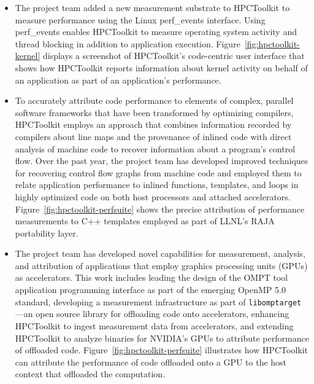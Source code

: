 \begin{itemize}
\item
The project team added a new measurement substrate to HPCToolkit to measure performance using the Linux perf\_events interface. Using perf\_events enables HPCToolkit to measure operating system activity and thread blocking in addition to application execution. Figure~\ref{fig:hpctoolkit-kernel} displays a screenshot of HPCToolkit's code-centric user interface that shows how HPCToolkit reports information about kernel activity on behalf of an application as part of an application's performance. 
 \item
To accurately attribute code performance to elements of complex, parallel software frameworks that have been transformed  by optimizing compilers, HPCToolkit employs an approach that combines information recorded by compilers about line maps and the provenance of inlined code with direct analysis of machine code to recover information about a program's control flow. Over the past year, the project team has developed improved techniques for recovering control flow graphs from machine code 
 and employed them to relate application performance to inlined functions, templates, and  loops in highly optimized code on both host processors and attached accelerators. Figure~\ref{fig:hpctoolkit-perfsuite} shows the precise attribution of performance measurements to C++ templates employed as part of LLNL's RAJA portability layer.
\item
The project team has developed novel capabilities for measurement, analysis, and attribution of applications that employ graphics processing units (GPUs) as accelerators.  This work includes leading the design of the OMPT tool application programming interface as part of the emerging OpenMP 5.0 standard, developing a measurement infrastructure as part of {\tt libomptarget}---an open source library for offloading code onto accelerators, enhancing HPCToolkit to ingest measurement data from accelerators, and extending HPCToolkit to analyze binaries for NVIDIA's GPUs to attribute performance of offloaded code. Figure~\ref{fig:hpctoolkit-perfsuite} illustrates how HPCToolkit can attribute the performance of code offloaded onto a GPU to the host context that offloaded the computation.
\end{itemize}

